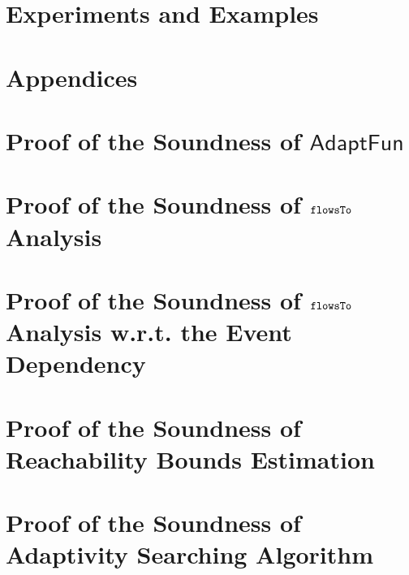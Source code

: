 \documentclass[a4paper,11pt]{article}
\newcommand{\THESYSTEM}{\textsf{AdaptFun}}
\begin{document}
\section{Experiments and Examples}

%
\clearpage
\appendix
{}
\section*{Appendices}
\section{Proof of the Soundness of $\THESYSTEM$}

\clearpage
\section{Proof of the Soundness of $\mathtt{flowsTo}$ Analysis}

\clearpage
\section{Proof of the Soundness of $\mathtt{flowsTo}$ Analysis w.r.t. the Event Dependency}

\clearpage
% 
% 
\clearpage
\section{Proof of the Soundness of Reachability Bounds Estimation}

\clearpage
\section{Proof of the Soundness of Adaptivity Searching Algorithm}



\end{document}

